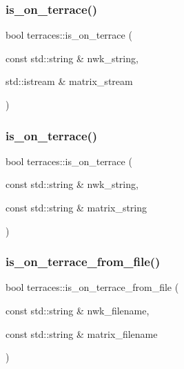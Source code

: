 \mbox{\label{namespaceterraces_aaa1cfc0f0adeee6408adaf1049c24227}} 
\subsubsection{\texorpdfstring{is\+\_\+on\+\_\+terrace()}{is\_on\_terrace()}\hspace{0.1cm}{\footnotesize\ttfamily [3/4]}}
{\footnotesize\ttfamily bool terraces\+::is\+\_\+on\+\_\+terrace (\begin{DoxyParamCaption}\item[{const std\+::string \&}]{nwk\+\_\+string,  }\item[{std\+::istream \&}]{matrix\+\_\+stream }\end{DoxyParamCaption})}

\mbox{\label{namespaceterraces_a2dd57bda3af31246492ad52438015b42}} 
\subsubsection{\texorpdfstring{is\+\_\+on\+\_\+terrace()}{is\_on\_terrace()}\hspace{0.1cm}{\footnotesize\ttfamily [4/4]}}
{\footnotesize\ttfamily bool terraces\+::is\+\_\+on\+\_\+terrace (\begin{DoxyParamCaption}\item[{const std\+::string \&}]{nwk\+\_\+string,  }\item[{const std\+::string \&}]{matrix\+\_\+string }\end{DoxyParamCaption})}

\mbox{\label{namespaceterraces_afadd08934abd0d298e2b36c7025e4565}} 
\subsubsection{\texorpdfstring{is\+\_\+on\+\_\+terrace\+\_\+from\+\_\+file()}{is\_on\_terrace\_from\_file()}}
{\footnotesize\ttfamily bool terraces\+::is\+\_\+on\+\_\+terrace\+\_\+from\+\_\+file (\begin{DoxyParamCaption}\item[{const std\+::string \&}]{nwk\+\_\+filename,  }\item[{const std\+::string \&}]{matrix\+\_\+filename }\end{DoxyParamCaption})}

